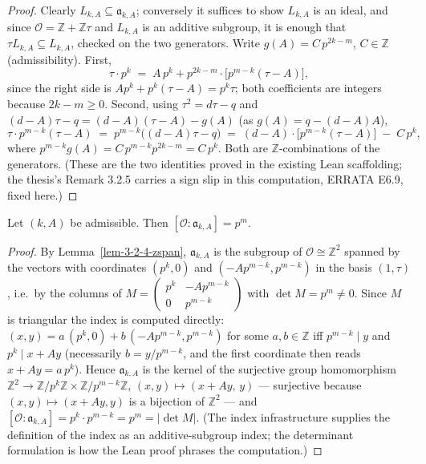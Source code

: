 \begin{proof}
  Clearly $L_{k,A} \subseteq \mathfrak{a}_{k,A}$; conversely it suffices to show
  $L_{k,A}$ is an ideal, and since $\mathcal{O} = \mathbb{Z} + \mathbb{Z}\tau$ and
  $L_{k,A}$ is an additive subgroup, it is enough that $\tau L_{k,A} \subseteq L_{k,A}$,
  checked on the two generators. Write $g(A) = C\,p^{2k-m}$, $C \in \mathbb{Z}$
  (admissibility). First,
  \[
    \tau \cdot p^k \;=\; A\,p^k + p^{2k-m}\cdot\bigl[p^{m-k}(\tau - A)\bigr],
  \]
  since the right side is $Ap^k + p^k(\tau - A) = p^k\tau$; both coefficients are
  integers because $2k - m \ge 0$. Second, using $\tau^2 = d\tau - q$ and
  $(d - A)\tau - q = (d-A)(\tau - A) - g(A)$ (as $g(A) = q - (d-A)A$),
  \[
    \tau \cdot p^{m-k}(\tau - A)
    \;=\; p^{m-k}\bigl((d - A)\tau - q\bigr)
    \;=\; (d - A)\cdot\bigl[p^{m-k}(\tau - A)\bigr] \;-\; C\,p^k,
  \]
  where $p^{m-k}g(A) = C\,p^{m-k}p^{2k-m} = C\,p^k$. Both are $\mathbb{Z}$-combinations
  of the generators. (These are the two identities proved in the existing Lean
  scaffolding; the thesis's Remark 3.2.5 carries a sign slip in this computation,
  ERRATA E6.9, fixed here.)
\end{proof}

\begin{lemma}
  \label{lem-3-2-4-index}
  Let $(k, A)$ be admissible. Then $[\mathcal{O} : \mathfrak{a}_{k,A}] = p^m$.
\end{lemma}

\begin{proof}
  By Lemma~\ref{lem-3-2-4-zspan}, $\mathfrak{a}_{k,A}$ is the subgroup of
  $\mathcal{O} \cong \mathbb{Z}^2$ spanned by the vectors with coordinates
  $(p^k, 0)$ and $(-Ap^{m-k}, p^{m-k})$ in the basis $(1, \tau)$, i.e.\ by the
  columns of
  $M = \begin{pmatrix} p^k & -Ap^{m-k} \\ 0 & p^{m-k}\end{pmatrix}$
  with $\det M = p^m \ne 0$. Since $M$ is triangular the index is computed
  directly: $(x, y) = a\,(p^k, 0) + b\,(-Ap^{m-k}, p^{m-k})$ for some
  $a, b \in \mathbb{Z}$ iff $p^{m-k} \mid y$ and $p^k \mid x + Ay$
  (necessarily $b = y/p^{m-k}$, and the first coordinate then reads
  $x + Ay = a\,p^k$). Hence $\mathfrak{a}_{k,A}$ is the kernel of the
  surjective group homomorphism
  $\mathbb{Z}^2 \to \mathbb{Z}/p^k\mathbb{Z} \times \mathbb{Z}/p^{m-k}\mathbb{Z}$,
  $(x, y) \mapsto (x + Ay,\, y)$ — surjective because
  $(x, y) \mapsto (x + Ay, y)$ is a bijection of $\mathbb{Z}^2$ — and
  $[\mathcal{O} : \mathfrak{a}_{k,A}] = p^k \cdot p^{m-k} = p^m
  = \lvert \det M\rvert$. (The index infrastructure supplies the definition
  of the index as an additive-subgroup index; the determinant formulation is
  how the Lean proof phrases the computation.)
\end{proof}

